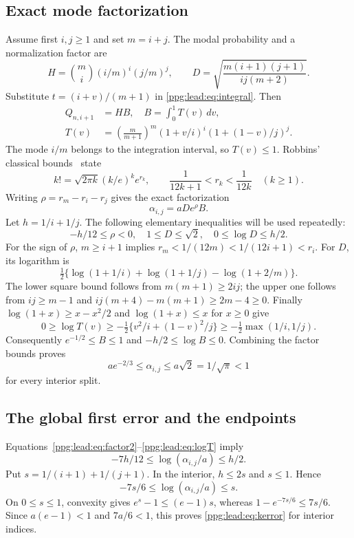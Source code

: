 \documentclass[11pt,letterpaper]{article}
\theoremstyle{remark}\newtheorem{remark}[theorem]{Remark}
\numberwithin{equation}{section}
\begin{document}
\subsection{Exact mode factorization}
Assume first $i,j\ge1$ and set $m=i+j$. The modal probability and a normalization factor are
\[
 H=\binom mi(i/m)^i(j/m)^j,\qquad
 D=\sqrt{\frac{m(i+1)(j+1)}{ij(m+2)}}.
\]
Substitute $t=(i+v)/(m+1)$ in \eqref{ppg:lead:eq:integral}. Then
\begin{align}
 Q_{n,i+1}&=HB,\quad B=\int_0^1 T(v)\,dv,\label{ppg:lead:eq:factor1}\\
 T(v)&=\left(\frac m{m+1}\right)^m
       (1+v/i)^i(1+(1-v)/j)^j.\label{ppg:lead:eq:T}
\end{align}
The mode $i/m$ belongs to the integration interval, so $T(v)\le1$. Robbins' classical bounds~\cite{robbins} state
\begin{equation}\label{ppg:lead:eq:robbins}
 k!=\sqrt{2\pi k}(k/e)^ke^{r_k},\qquad
 \frac1{12k+1}<r_k<\frac1{12k}\quad(k\ge1).
\end{equation}
Writing $\rho=r_m-r_i-r_j$ gives the exact factorization
\begin{equation}\label{ppg:lead:eq:factor2}
 \alpha_{i,j}=aDe^\rho B.
\end{equation}
Let $h=1/i+1/j$. The following elementary inequalities will be used repeatedly:
\begin{equation}\label{ppg:lead:eq:basicfactors}
 -h/12\le\rho<0,\quad 1\le D\le\sqrt2,\quad
 0\le\log D\le h/2.
\end{equation}
For the sign of $\rho$, $m\ge i+1$ implies
$r_m<1/(12m)<1/(12i+1)<r_i$. For $D$, its logarithm is
\[
 \tfrac12\{\log(1+1/i)+\log(1+1/j)-\log(1+2/m)\}.
\]
The lower square bound follows from $m(m+1)\ge2ij$; the upper one follows from $ij\ge m-1$ and
$ij(m+4)-m(m+1)\ge2m-4\ge0$.
Finally $\log(1+x)\ge x-x^2/2$ and $\log(1+x)\le x$ for $x\ge0$ give
\begin{equation}\label{ppg:lead:eq:logT}
 0\ge\log T(v)\ge-\tfrac12\{v^2/i+(1-v)^2/j\}
 \ge-\tfrac12\max(1/i,1/j).
\end{equation}
Consequently $e^{-1/2}\le B\le1$ and $-h/2\le\log B\le0$. Combining the factor bounds proves
\[
 ae^{-2/3}\le\alpha_{i,j}\le a\sqrt2=1/\sqrt\pi<1
\]
for every interior split.

\subsection{The global first error and the endpoints}
Equations~\eqref{ppg:lead:eq:factor2}--\eqref{ppg:lead:eq:logT} imply
\[
 -7h/12\le\log(\alpha_{i,j}/a)\le h/2.
\]
Put $s=1/(i+1)+1/(j+1)$. In the interior, $h\le2s$ and $s\le1$. Hence
\[
 -7s/6\le\log(\alpha_{i,j}/a)\le s.
\]
On $0\le s\le1$, convexity gives $e^s-1\le(e-1)s$, whereas
$1-e^{-7s/6}\le7s/6$. Since $a(e-1)<1$ and $7a/6<1$, this proves \eqref{ppg:lead:eq:kerror} for interior indices.
\end{document}
